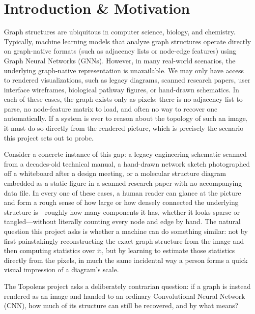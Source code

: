 \documentclass[11pt,letterpaper]{article}
\numberwithin{equation}{section}
\numberwithin{figure}{section}
\numberwithin{table}{section}
\begin{document}
\section{Introduction \& Motivation}
\label{sec:introduction}
Graph structures are ubiquitous in computer science, biology, and chemistry. Typically, machine learning models that analyze graph structures operate directly on graph-native formats (such as adjacency lists or node-edge features) using Graph Neural Networks (GNNs). However, in many real-world scenarios, the underlying graph-native representation is unavailable. We may only have access to rendered visualizations, such as legacy diagrams, scanned research papers, user interface wireframes, biological pathway figures, or hand-drawn schematics. In each of these cases, the graph exists only as pixels: there is no adjacency list to parse, no node-feature matrix to load, and often no way to recover one automatically. If a system is ever to reason about the topology of such an image, it must do so directly from the rendered picture, which is precisely the scenario this project sets out to probe.

Consider a concrete instance of this gap: a legacy engineering schematic scanned from a decades-old technical manual, a hand-drawn network sketch photographed off a whiteboard after a design meeting, or a molecular structure diagram embedded as a static figure in a scanned research paper with no accompanying data file. In every one of these cases, a human reader can glance at the picture and form a rough sense of how large or how densely connected the underlying structure is---roughly how many components it has, whether it looks sparse or tangled---without literally counting every node and edge by hand. The natural question this project asks is whether a machine can do something similar: not by first painstakingly reconstructing the exact graph structure from the image and then computing statistics over it, but by learning to estimate those statistics directly from the pixels, in much the same incidental way a person forms a quick visual impression of a diagram's scale.

The Topolens project asks a deliberately contrarian question: if a graph is instead rendered as an image and handed to an ordinary Convolutional Neural Network (CNN), how much of its structure can still be recovered, and by what means?
\end{document}
